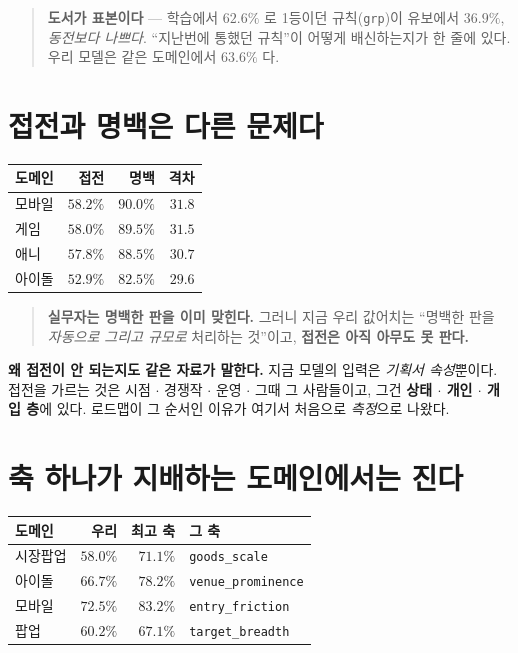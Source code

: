 \documentclass[11pt]{article}
\begin{document}
\begin{quote}
\textbf{도서가 표본이다} --- 학습에서 $62.6\%$ 로 1등이던 규칙(\texttt{grp})이
유보에서 \textbf{$36.9\%$}, \emph{동전보다 나쁘다}. ``지난번에 통했던 규칙''이
어떻게 배신하는지가 한 줄에 있다. 우리 모델은 같은 도메인에서 $63.6\%$ 다.
\end{quote}

\section{접전과 명백은 다른 문제다}

\begin{center}
\begin{tabular}{lrrr}
\hline
도메인 & 접전 & 명백 & 격차 \\
\hline
모바일 & $58.2\%$ & $90.0\%$ & $31.8$ \\
게임 & $58.0\%$ & $89.5\%$ & $31.5$ \\
애니 & $57.8\%$ & $88.5\%$ & $30.7$ \\
아이돌 & $52.9\%$ & $82.5\%$ & $29.6$ \\
\hline
\end{tabular}
\end{center}

\begin{quote}
\textbf{실무자는 명백한 판을 이미 맞힌다.} 그러니 지금 우리 값어치는
``명백한 판을 \emph{자동으로 그리고 규모로} 처리하는 것''이고,
\textbf{접전은 아직 아무도 못 판다.}
\end{quote}

\textbf{왜 접전이 안 되는지도 같은 자료가 말한다.} 지금 모델의 입력은
\emph{기획서 속성}뿐이다. 접전을 가르는 것은 시점 $\cdot$ 경쟁작 $\cdot$ 운영
$\cdot$ 그때 그 사람들이고, 그건 \textbf{상태 $\cdot$ 개인 $\cdot$ 개입 층}에
있다. 로드맵이 그 순서인 이유가 여기서 처음으로 \emph{측정}으로 나왔다.

\section{축 하나가 지배하는 도메인에서는 진다}

\begin{center}
\begin{tabular}{lrrl}
\hline
도메인 & 우리 & 최고 축 & 그 축 \\
\hline
시장팝업 & $58.0\%$ & $\mathbf{71.1\%}$ & \texttt{goods\_scale} \\
아이돌 & $66.7\%$ & $\mathbf{78.2\%}$ & \texttt{venue\_prominence} \\
모바일 & $72.5\%$ & $\mathbf{83.2\%}$ & \texttt{entry\_friction} \\
팝업 & $60.2\%$ & $\mathbf{67.1\%}$ & \texttt{target\_breadth} \\
\hline
\end{tabular}
\end{center}
\end{document}
